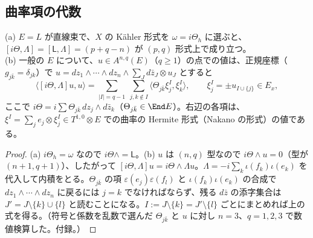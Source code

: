 \subsection{曲率項の代数}
\begin{lem}\label{lem:curv}\tP
(a) $E=L$ が直線束で、$X$ の Kähler 形式を $\omega=i\Theta_h$ に選ぶと、$[i\Theta,\Lambda]=[\mathsf L,\Lambda]=(p+q-n)$ が $(p,q)$ 形式上で成り立つ。\\
(b) 一般の $E$ について、$u\in A^{n,q}(E)$（$q\ge1$）の点での値は、正規座標（$g_{j\bar k}=\delta_{jk}$）で $u=dz_1\wedge\cdots\wedge dz_n\wedge\sum_J d\bar z_J\otimes u_J$ とすると
\[
\langle[i\Theta,\Lambda]u,u\rangle=\sum_{|I|=q-1}\ \sum_{j,k\notin I}\langle\Theta_{j\bar k}\xi^I_j,\xi^I_k\rangle,\qquad \xi^I_j=\pm u_{I\cup\{j\}}\in E_x,
\]
ここで $i\Theta=i\sum\Theta_{j\bar k}\,dz_j\wedge d\bar z_k$（$\Theta_{j\bar k}\in\End E$）。右辺の各項は、$\xi^I=\sum_je_j\otimes\xi^I_j\in T^{1,0}\otimes E$ での曲率の Hermite 形式（Nakano の形式）の値である。
\end{lem}
\begin{proof}
(a) $i\Theta_h=\omega$ なので $i\Theta\wedge=\mathsf L$。(b) $u$ は $(n,q)$ 型なので $i\Theta\wedge u=0$（型が $(n+1,q+1)$）、したがって $[i\Theta,\Lambda]u=i\Theta\wedge\Lambda u$。$\Lambda=-i\sum_k\iota(f_k)\iota(e_k)$ を代入して内積をとる。$\Theta_{j\bar k}$ の項 $\varepsilon(e_j)\varepsilon(f_l)$ と $\iota(f_k)\iota(e_k)$ の合成で $dz_1\wedge\cdots\wedge dz_n$ に戻るには $j=k$ でなければならず、残る $d\bar z$ の添字集合は $J'=J\setminus\{k\}\cup\{l\}$ と読むことになる。$I:=J\setminus\{k\}=J'\setminus\{l\}$ ごとにまとめれば上の式を得る。（符号と係数を乱数で選んだ $\Theta_{j\bar k}$ と $u$ に対し $n=3$、$q=1,2,3$ で数値検算した。付録。）
\end{proof}

